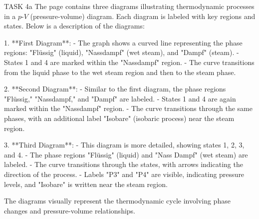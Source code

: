 TASK 4a  
The page contains three diagrams illustrating thermodynamic processes in a \( p \)-\( V \) (pressure-volume) diagram. Each diagram is labeled with key regions and states. Below is a description of the diagrams:

1. **First Diagram**:  
   - The graph shows a curved line representing the phase regions: "Flüssig" (liquid), "Nassdampf" (wet steam), and "Dampf" (steam).  
   - States 1 and 4 are marked within the "Nassdampf" region.  
   - The curve transitions from the liquid phase to the wet steam region and then to the steam phase.  

2. **Second Diagram**:  
   - Similar to the first diagram, the phase regions "Flüssig," "Nassdampf," and "Dampf" are labeled.  
   - States 1 and 4 are again marked within the "Nassdampf" region.  
   - The curve transitions through the same phases, with an additional label "Isobare" (isobaric process) near the steam region.  

3. **Third Diagram**:  
   - This diagram is more detailed, showing states 1, 2, 3, and 4.  
   - The phase regions "Flüssig" (liquid) and "Nass Dampf" (wet steam) are labeled.  
   - The curve transitions through the states, with arrows indicating the direction of the process.  
   - Labels "P3" and "P4" are visible, indicating pressure levels, and "Isobare" is written near the steam region.  

The diagrams visually represent the thermodynamic cycle involving phase changes and pressure-volume relationships.